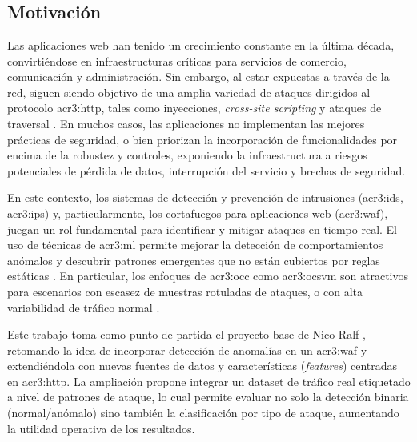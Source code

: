 \renewcommand{\thesection}{\arabic{section}}
\chapter{}
\label{chap:p_contenido}


\section{Motivación}

Las aplicaciones web han tenido un crecimiento constante en la última década,
convirtiéndose en infraestructuras críticas para servicios de comercio, comunicación
y administración. Sin embargo, al estar expuestas a través de la red, siguen siendo
objetivo de una amplia variedad de ataques dirigidos al protocolo \gls{acr3:http},
tales como inyecciones, \textit{cross-site scripting} y ataques de traversal
\cite{gimenez2015tfg}.
En muchos casos, las aplicaciones no implementan las mejores prácticas de seguridad,
o bien priorizan la incorporación de funcionalidades por encima de la robustez
y controles, exponiendo la infraestructura a riesgos potenciales de pérdida de datos,
interrupción del servicio y brechas de seguridad.

En este contexto, los sistemas de detección y prevención de intrusiones
(\gls{acr3:ids}, \gls{acr3:ips}) y, particularmente, los cortafuegos para aplicaciones
web (\gls{acr3:waf}), juegan un rol fundamental para identificar y mitigar ataques en
tiempo real. El uso de técnicas de \gls{acr3:ml} permite mejorar la detección de
comportamientos anómalos y descubrir patrones emergentes que no están cubiertos por
reglas estáticas \cite{buczak2016survey,kruegel2003anomaly,nguyen2011application}.
En particular, los enfoques de \gls{acr3:occ} como \gls{acr3:ocsvm} son
atractivos para escenarios con escasez de muestras rotuladas de ataques, o con
alta variabilidad de tráfico normal \cite{khan2009survey,parhizkar2015oc}.

Este trabajo toma como punto de partida el proyecto base de Nico Ralf
\cite{gimenez2015tfg}, retomando la idea de incorporar detección de anomalías en un
\gls{acr3:waf} y extendiéndola con nuevas fuentes de datos y características
(\textit{features}) centradas en \gls{acr3:http}. La ampliación propone integrar
un dataset de tráfico real etiquetado a nivel de patrones de ataque, lo cual permite
evaluar no solo la detección binaria (normal/anómalo) sino también la clasificación
por tipo de ataque, aumentando la utilidad operativa de los resultados.

